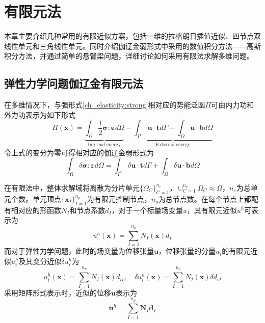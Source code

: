 \chapter{有限元法}
本章主要介绍几种常用的有限近似方案，包括一维的拉格朗日插值近似、四节点双线性单元和三角线性单元。同时介绍伽辽金弱形式中采用的数值积分方法——高斯积分方法，并通过简单的悬臂梁问题，详细讨论如何采用有限法求解多维问题。
\section{弹性力学问题伽辽金有限元法}
在多维情况下，与强形式\eqref{ch_elasticity:strong}相对应的势能泛函$\Pi$可由内力功和外力功表示为如下形式
\begin{equation}
        \Pi(\boldsymbol x) = \underbrace{\int_\Omega \frac{1}{2} \boldsymbol \sigma : \boldsymbol \varepsilon d\Omega}_{\mathrm{Internal\;energy}} - \underbrace{\int_{\Gamma^t} \boldsymbol u \cdot \boldsymbol t d\Gamma - \int_\Omega \boldsymbol u \cdot \boldsymbol b d\Omega}_{\mathrm{External\;energy}}
\end{equation}
令上式的变分为零可得相对应的伽辽金弱形式为
\begin{equation}\label{ch_fem:weak}
\int_\Omega \delta \boldsymbol \sigma : \boldsymbol \varepsilon d\Omega = \int_{\Gamma^t} \delta \boldsymbol u \cdot \boldsymbol t d\Gamma + \int_\Omega \delta \boldsymbol u \cdot \boldsymbol b d\Omega
\end{equation} \par
在有限法中，整体求解域将离散为分片单元$\{\Omega_C\}_{C=1}^{n_e}$，$\cup_{C=1}^{n_e}\Omega_C\approx \Omega$，$n_e$为总单元个数。单元顶点$\{\boldsymbol x_I\}_{I=1}^{n_p}$为有限元控制节点，$n_p$为总节点数。在每个节点上都配有相对应的形函数$N_I$和节点系数$d_I$，对于一个标量场变量$u$，其有限元近似$u^h$可表示为
\begin{equation}
u^h(\boldsymbol x) = \sum_{I=1}^{n_p} N_I(\boldsymbol x) d_I
\end{equation}
而对于弹性力学问题，此时的场变量为位移张量$\boldsymbol u$，位移张量的分量$u_i$的有限元近似$u_i^h$及其变分近似$\delta u_i^h$为
\begin{equation}\label{ch_fem:uh}
u_i^h(\boldsymbol x) = \sum_{I=1}^{n_p} N_I(\boldsymbol x) d_{iI},\quad
\delta u_i^h(\boldsymbol x) = \sum_{I=1}^{n_p} N_I(\boldsymbol x) \delta d_{iI}
\end{equation}
采用矩阵形式表示时，近似的位移$\boldsymbol u$表示为
\begin{equation}
\boldsymbol u^h = \sum_{I=1}^{n_p}\boldsymbol N_I \boldsymbol d_I
\end{equation}
